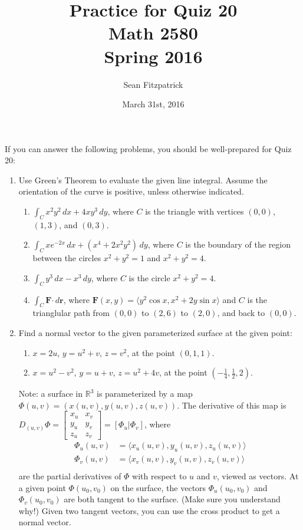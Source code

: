 \documentclass[letterpaper,12pt]{article}
\title{Practice for Quiz 20\\Math 2580\\Spring 2016}
\author{Sean Fitzpatrick}
\date{March 31st, 2016}
\newcommand{\R}{\mathbb{R}}
\renewcommand{\r}{\mathbf{r}}
\newcommand{\dotp}{\boldsymbol{\cdot}}
\newcommand{\F}{\mathbf{F}}
\begin{document}
 \maketitle

If you can answer the following problems, you should be well-prepared for Quiz 20:



\begin{enumerate}
 \item Use Green's Theorem to evaluate the given line integral. Assume the orientation of the curve is positive, unless otherwise indicated.
\begin{enumerate}
 \item $\int_C x^2y^2\,dx+4xy^3\,dy$, where $C$ is the triangle with vertices $(0,0)$, $(1,3)$, and $(0,3)$.
 \item $\int_C xe^{-2x}\,dx+(x^4+2x^2y^2)\,dy$, where $C$ is the boundary of the region between the circles $x^2+y^2=1$ and $x^2+y^2=4$.
 \item $\int_C y^3\,dx-x^3\,dy$, where $C$ is the circle $x^2+y^2=4$.
 \item $\int_C \F\dotp \,d\r$, where $\F(x,y) = \langle y^2\cos x, x^2+2y\sin x\rangle$ and $C$ is the trianglular path from $(0,0)$ to $(2,6)$ to $(2,0)$, and back to $(0,0)$.
\end{enumerate}
 \item Find a normal vector to the given parameterized surface at the given point:
\begin{enumerate}
 \item $x=2u$, $y=u^2+v$, $z=v^2$, at the point $(0,1,1)$.
 \item $x=u^2-v^2$, $y=u+v$, $z=u^2+4v$, at the point $(-\frac{1}{4}, \frac{1}{2}, 2)$.
\end{enumerate}
Note: a surface in $\R^3$ is parameterized by a map $\Phi(u,v) = (x(u,v), y(u,v), z(u,v))$. The derivative of this map is $D_{(u,v)}\Phi = \begin{bmatrix} x_u & x_v\\y_u&y_v\\z_u&z_v\end{bmatrix} = [\Phi_u | \Phi_v]$, where 
\begin{align*}
 \Phi_u(u,v) &= \langle x_u(u,v), y_u(u,v), z_u(u,v)\rangle\\
 \Phi_v(u,v) &= \langle x_v(u,v), y_v(u,v), z_v(u,v)\rangle\\
\end{align*}
are the partial derivatives of $\Phi$ with respect to $u$ and $v$, viewed as vectors. At a given point $\Phi(u_0,v_0)$ on the surface, the vectors $\Phi_u(u_0,v_0)$ and $\Phi_v(u_0,v_0)$ are both tangent to the surface. (Make sure you understand why!) Given two tangent vectors, you can use the cross product to get a normal vector.


 \end{enumerate}
\end{document}
